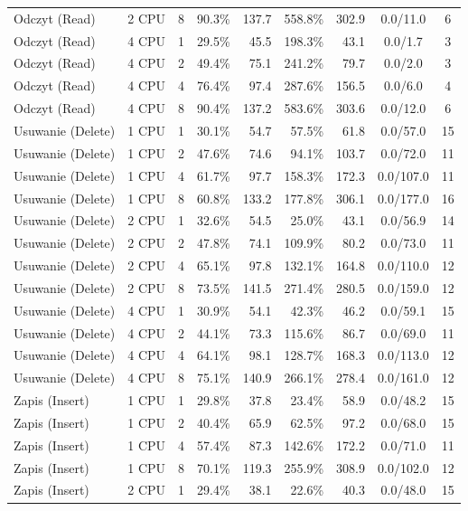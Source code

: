 \begin{table}[ht]
{\begin{tabular}{llcrrrrcc}
Odczyt (Read) & 2 CPU & 8 & 90.3\% & 137.7 & 558.8\% & 302.9 & 0.0/11.0 & 6 \\
Odczyt (Read) & 4 CPU & 1 & 29.5\% & 45.5 & 198.3\% & 43.1 & 0.0/1.7 & 3 \\
Odczyt (Read) & 4 CPU & 2 & 49.4\% & 75.1 & 241.2\% & 79.7 & 0.0/2.0 & 3 \\
Odczyt (Read) & 4 CPU & 4 & 76.4\% & 97.4 & 287.6\% & 156.5 & 0.0/6.0 & 4 \\
Odczyt (Read) & 4 CPU & 8 & 90.4\% & 137.2 & 583.6\% & 303.6 & 0.0/12.0 & 6 \\
Usuwanie (Delete) & 1 CPU & 1 & 30.1\% & 54.7 & 57.5\% & 61.8 & 0.0/57.0 & 15 \\
Usuwanie (Delete) & 1 CPU & 2 & 47.6\% & 74.6 & 94.1\% & 103.7 & 0.0/72.0 & 11 \\
Usuwanie (Delete) & 1 CPU & 4 & 61.7\% & 97.7 & 158.3\% & 172.3 & 0.0/107.0 & 11 \\
Usuwanie (Delete) & 1 CPU & 8 & 60.8\% & 133.2 & 177.8\% & 306.1 & 0.0/177.0 & 16 \\
Usuwanie (Delete) & 2 CPU & 1 & 32.6\% & 54.5 & 25.0\% & 43.1 & 0.0/56.9 & 14 \\
Usuwanie (Delete) & 2 CPU & 2 & 47.8\% & 74.1 & 109.9\% & 80.2 & 0.0/73.0 & 11 \\
Usuwanie (Delete) & 2 CPU & 4 & 65.1\% & 97.8 & 132.1\% & 164.8 & 0.0/110.0 & 12 \\
Usuwanie (Delete) & 2 CPU & 8 & 73.5\% & 141.5 & 271.4\% & 280.5 & 0.0/159.0 & 12 \\
Usuwanie (Delete) & 4 CPU & 1 & 30.9\% & 54.1 & 42.3\% & 46.2 & 0.0/59.1 & 15 \\
Usuwanie (Delete) & 4 CPU & 2 & 44.1\% & 73.3 & 115.6\% & 86.7 & 0.0/69.0 & 11 \\
Usuwanie (Delete) & 4 CPU & 4 & 64.1\% & 98.1 & 128.7\% & 168.3 & 0.0/113.0 & 12 \\
Usuwanie (Delete) & 4 CPU & 8 & 75.1\% & 140.9 & 266.1\% & 278.4 & 0.0/161.0 & 12 \\
Zapis (Insert) & 1 CPU & 1 & 29.8\% & 37.8 & 23.4\% & 58.9 & 0.0/48.2 & 15 \\
Zapis (Insert) & 1 CPU & 2 & 40.4\% & 65.9 & 62.5\% & 97.2 & 0.0/68.0 & 15 \\
Zapis (Insert) & 1 CPU & 4 & 57.4\% & 87.3 & 142.6\% & 172.2 & 0.0/71.0 & 11 \\
Zapis (Insert) & 1 CPU & 8 & 70.1\% & 119.3 & 255.9\% & 308.9 & 0.0/102.0 & 12 \\
Zapis (Insert) & 2 CPU & 1 & 29.4\% & 38.1 & 22.6\% & 40.3 & 0.0/48.0 & 15 \\

\end{tabular}}
\end{table}
